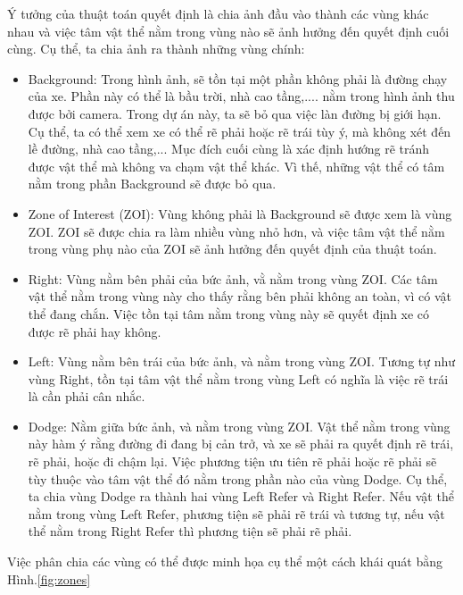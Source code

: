 \documentclass[a4paper,10pt]{article}
\begin{document}
	Ý tưởng của thuật toán quyết định là chia ảnh đầu vào thành các vùng khác nhau và việc tâm vật thể nằm trong vùng nào sẽ ảnh hưởng đến quyết định cuối cùng. Cụ thể, ta chia ảnh ra thành những vùng chính:
	\begin{itemize}
		\item Background: Trong hình ảnh, sẽ tồn tại một phần không phải là đường chạy của xe. Phần này có thể là bầu trời, nhà cao tầng,.... nằm trong hình ảnh thu được bởi camera. Trong dự án này, ta sẽ bỏ qua việc làn đường bị giới hạn. Cụ thể, ta có thể xem xe có thể rẽ phải hoặc rẽ trái tùy ý, mà không xét đến lề đường, nhà cao tầng,... Mục đích cuối cùng là xác định hướng rẽ tránh được vật thể mà không va chạm vật thể khác. Vì thế, những vật thể có tâm nằm trong phần Background sẽ được bỏ qua.

		\item Zone of Interest (ZOI): Vùng không phải là Background sẽ được xem là vùng ZOI. ZOI sẽ được chia ra làm nhiều vùng nhỏ hơn, và việc tâm vật thể nằm trong vùng phụ nào của ZOI sẽ ảnh hưởng đến quyết định của thuật toán.

		\item Right: Vùng nằm bên phải của bức ảnh, vằ nằm trong vùng ZOI. Các tâm vật thể nằm trong vùng này cho thấy rằng bên phải không an toàn, vì có vật thể đang chắn. Việc tồn tại tâm nằm trong vùng này sẽ quyết định xe có được rẽ phải hay không.

		\item Left: Vùng nằm bên trái của bức ảnh, và nằm trong vùng ZOI. Tương tự như vùng Right, tồn tại tâm vật thể nằm trong vùng Left có nghĩa là việc rẽ trái là cần phải cân nhắc.

		\item Dodge: Nằm giữa bức ảnh, và nằm trong vùng ZOI. Vật thể nằm trong vùng này hàm ý rằng đường đi đang bị cản trở, và xe sẽ phải ra quyết định rẽ trái, rẽ phải, hoặc đi chậm lại. Việc phương tiện ưu tiên rẽ phải hoặc rẽ phải sẽ tùy thuộc vào tâm vật thể đó nằm trong phần nào của vùng Dodge. Cụ thể, ta chia vùng Dodge ra thành hai vùng Left Refer và Right Refer. Nếu vật thể nằm trong vùng Left Refer, phương tiện sẽ phải rẽ trái và tương tự, nếu vật thể nằm trong Right Refer thì phương tiện sẽ phải rẽ phải. 

	\end{itemize}		
Việc phân chia các vùng có thể được minh họa cụ thể một cách khái quát bằng Hình.\ref{fig:zones}
\end{document}
